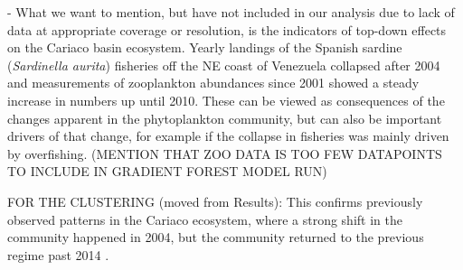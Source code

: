 




- What we want to mention, but have not included in our analysis due to lack of data at appropriate coverage or resolution, is the indicators of top-down effects on the Cariaco basin ecosystem. Yearly landings of the Spanish sardine (\textit{Sardinella aurita}) fisheries off the NE coast of Venezuela collapsed after 2004 and measurements of zooplankton abundances since 2001 showed a steady increase in numbers up until 2010. These can be viewed as consequences of the changes apparent in the phytoplankton community, but can also be important drivers of that change, for example if the collapse in fisheries was mainly driven by overfishing. (MENTION THAT ZOO DATA IS TOO FEW DATAPOINTS TO INCLUDE IN GRADIENT FOREST MODEL RUN)

FOR THE CLUSTERING (moved from Results): This confirms previously observed patterns in the Cariaco ecosystem, where a strong shift in the community happened in 2004, but the community returned to the previous regime past 2014 \cite{taylor_ecosystem_2012, muller-karger_scientific_2019}.











